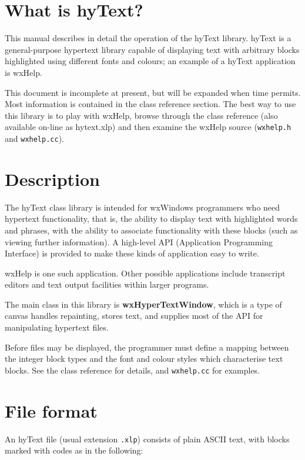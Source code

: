 \section{What is hyText?}

This manual describes in detail the operation of the hyText library.
hyText is a general-purpose hypertext library capable of displaying
text with arbitrary blocks highlighted using different fonts and
colours; an example of a hyText application is wxHelp.

This document is incomplete at present, but will be expanded when time
permits. Most information is contained in the class reference section.
The best way to use this library is to play with wxHelp, browse
through the class reference (also available on-line as hytext.xlp) and
then examine the wxHelp source ({\tt wxhelp.h} and {\tt wxhelp.cc}).

\section{Description}

The hyText class library is intended for wxWindows programmers who
need hypertext functionality, that is, the ability to display text
with highlighted words and phrases, with the ability to associate
functionality with these blocks (such as viewing further information).
A high-level API (Application Programming Interface) is provided
to make these kinds of application easy to write.

wxHelp is one such application. Other possible applications include
transcript editors and text output facilities within larger programs.

The main class in this library is {\bf wxHyperTextWindow}, which is a
type of canvas handles repainting, stores text, and supplies most of
the API for manipulating hypertext files.

Before files may be displayed, the programmer must define a mapping
between the integer block types and the font and colour styles which
characterise text blocks. See the class reference for details, and {\tt wxhelp.cc} for
examples.

\section{File format}

An hyText file (usual extension {\tt .xlp}) consists of plain ASCII
text, with blocks marked with codes as in the following:

